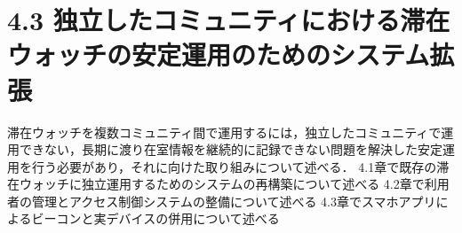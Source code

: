 \chapter{4.3 独立したコミュニティにおける滞在ウォッチの安定運用のためのシステム拡張}

滞在ウォッチを複数コミュニティ間で運用するには，独立したコミュニティで運用できない，長期に渡り在室情報を継続的に記録できない問題を解決した安定運用を行う必要があり，それに向けた取り組みについて述べる．
4.1章で既存の滞在ウォッチに独立運用するためのシステムの再構築について述べる
4.2章で利用者の管理とアクセス制御システムの整備について述べる
4.3章でスマホアプリによるビーコンと実デバイスの併用について述べる









